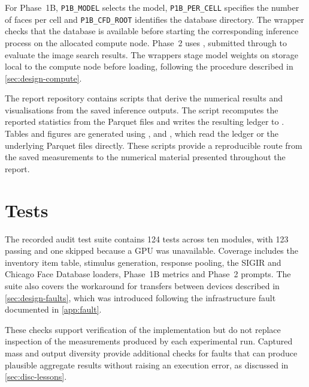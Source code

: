 For Phase~1B, \texttt{P1B\_MODEL} selects the model,
\texttt{P1B\_PER\_CELL} specifies the number of faces per cell and
\texttt{P1B\_CFD\_ROOT} identifies the database directory. The wrapper checks
that the database is available before starting the corresponding inference
process on the allocated compute node. Phase~2 uses
, submitted through
 to evaluate the image search results.
The wrappers stage model weights on storage local to the compute node before
loading, following the procedure described in \cref{sec:design-compute}.

The report repository contains scripts that derive the numerical results and
visualisations from the saved inference outputs. The script
 recomputes the reported statistics from the
Parquet files and writes the resulting ledger to
. Tables and figures are generated using
,  and
, which read the ledger or the underlying
Parquet files directly. These scripts provide a reproducible route from the
saved measurements to the numerical material presented throughout the report.

\section{Tests}\label{app:repro-tests}

The recorded audit test suite contains 124 tests across ten modules, with
123 passing and one skipped because a GPU was unavailable. Coverage includes
the inventory item table, stimulus generation, response pooling, the SIGIR
and Chicago Face Database loaders, Phase~1B metrics and Phase~2 prompts.
The suite also covers the workaround for transfers between devices described
in \cref{sec:design-faults}, which was introduced following the infrastructure
fault documented in \cref{app:fault}.

These checks support verification of the implementation but do not replace
inspection of the measurements produced by each experimental run. Captured
mass and output diversity provide additional checks for faults that can
produce plausible aggregate results without raising an execution error, as
discussed in \cref{sec:disc-lessons}.
